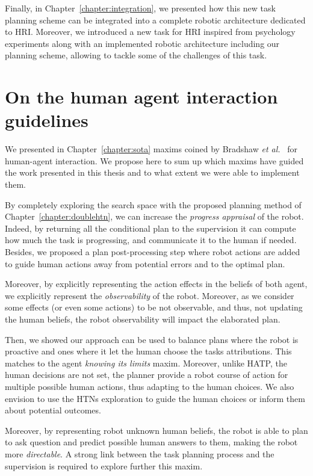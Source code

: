 \documentclass[a4paper,11pt,twoside]{StyleThese}
\begin{document}
Finally, in Chapter~\ref{chapter:integration}, we presented how this new task planning scheme can be integrated into a complete robotic architecture dedicated to HRI. Moreover, we introduced a new task for HRI inspired from psychology experiments along with an implemented robotic architecture including our planning scheme, allowing to tackle some of the challenges of this task.

\section*{On the human agent interaction guidelines}
We presented in Chapter~\ref{chapter:sota} maxims coined by Bradshaw \textit{et al.}~\cite{bradshaw2011human} for human-agent interaction. We propose here to sum up which maxims have guided the work presented in this thesis and to what extent we were able to implement them.

By completely exploring the search space with the proposed planning method of Chapter~\ref{chapter:doublehtn}, we can increase the \textit{progress appraisal} of the robot. Indeed, by returning all the conditional plan to the supervision it can compute how much the task is progressing, and communicate it to the human if needed. Besides, we proposed a plan post-processing step where robot actions are added to guide human actions away from potential errors and to the optimal plan.

Moreover, by explicitly representing the action effects in the beliefs of both agent, we explicitly represent the \textit{observability} of the robot. Moreover, as we consider some effects (or even some actions) to be not observable, and thus, not updating the human beliefs, the robot observability will impact the elaborated plan.

Then, we showed our approach can be used to balance plans where the robot is proactive and ones where it let the human choose the tasks attributions. This matches to the agent \textit{knowing its limits} maxim. Moreover, unlike HATP, the human decisions are not set, the planner provide a robot course of action for multiple possible human actions, thus adapting to the human choices. We also envision to use the HTNs exploration to guide the human choices or inform them about potential outcomes.

Moreover, by representing robot unknown human beliefs, the robot is able to plan to ask question and predict possible human answers to them, making the robot more \textit{directable}. A strong link between the task planning process and the supervision is required to explore further this maxim.
\end{document}
